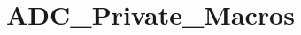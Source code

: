 \hypertarget{group___a_d_c___private___macros}{\section{A\-D\-C\-\_\-\-Private\-\_\-\-Macros}
\label{group___a_d_c___private___macros}
}
